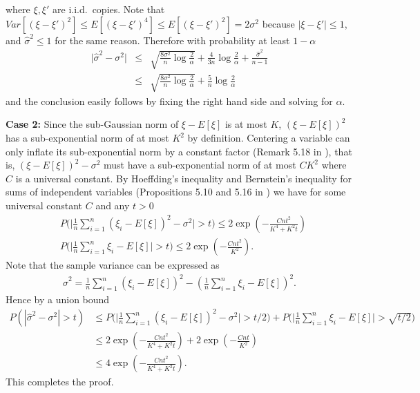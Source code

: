 \documentclass[mnsc,blindrev]{informs4} %
\newcommand{\abs}[1]{\left \vert #1 \right\vert}
\begin{document}
where $\xi,\xi'$ are i.i.d.~copies. Note that $Var[(\xi-\xi')^2]\leq E[(\xi-\xi')^4]\leq E[(\xi-\xi')^2]=2\sigma^2$ because $\abs{\xi-\xi'}\leq 1$, and $\hat\sigma^2\leq 1$ for the same reason. Therefore with probability at least $1-\alpha$
\begin{eqnarray*}
\lvert\hat\sigma^2-\sigma^2\rvert&\leq& \sqrt{\frac{8\sigma^2}{n}\log \frac{2}{\alpha}}+\frac{4}{3n}\log\frac{2}{\alpha}+\frac{\hat\sigma^2}{n-1}\\
&\leq& \sqrt{\frac{8\sigma^2}{n}\log \frac{2}{\alpha}}+\frac{5}{n}\log\frac{2}{\alpha}
\end{eqnarray*}
and the conclusion easily follows by fixing the right hand side and solving for $\alpha$.

\textbf{Case 2:} Since the sub-Gaussian norm of $\xi-E[\xi]$ is at most $K$, $(\xi-E[\xi])^2$ has a sub-exponential norm of at most $K^2$ by definition. Centering a variable can only inflate its sub-exponential norm by a constant factor (Remark 5.18 in \cite{vershynin2010introduction}), that is, $(\xi-E[\xi])^2-\sigma^2$ must have a sub-exponential norm of at most $CK^2$ where $C$ is a universal constant. By Hoeffding's inequality and Bernstein's inequality for sums of independent variables (Propositions 5.10 and 5.16 in \cite{vershynin2010introduction}) we have for some universal constant $C$ and any $t>0$
\begin{align*}
&P\big(\big\lvert\frac{1}{n}\sum_{i=1}^n(\xi_i-E[\xi])^2-\sigma^2\big\rvert>t\big)\leq 2\exp(-\frac{Cnt^2}{K^4+K^2t})\\
&P\big(\big\lvert\frac{1}{n}\sum_{i=1}^n\xi_i-E[\xi]\big\rvert>t\big)\leq 2\exp(-\frac{Cnt^2}{K^2}).
\end{align*}
Note that the sample variance can be expressed as
\begin{align*}
\hat\sigma^2=\frac{1}{n}\sum_{i=1}^n(\xi_i-E[\xi])^2-(\frac{1}{n}\sum_{i=1}^n\xi_i-E[\xi])^2.
\end{align*}
Hence by a union bound
\begin{align*}
P(\abs{\hat\sigma^2-\sigma^2}>t)&\leq P\big(\big\lvert\frac{1}{n}\sum_{i=1}^n(\xi_i-E[\xi])^2-\sigma^2\big\rvert>t/2\big)+P\big(\big\lvert\frac{1}{n}\sum_{i=1}^n\xi_i-E[\xi]\big\rvert>\sqrt{t/2}\big)\\
&\leq 2\exp(-\frac{Cnt^2}{K^4+K^2t})+2\exp(-\frac{Cnt}{K^2})\\
&\leq 4\exp(-\frac{Cnt^2}{K^4+K^2t}).
\end{align*}
This completes the proof.\hfill\Halmos
\end{document}
